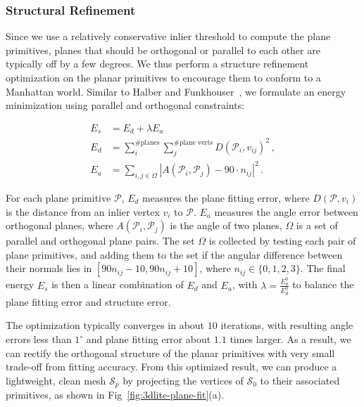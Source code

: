 \subsubsection{Structural Refinement}
\label{sec:fit-refine}

Since we use a relatively conservative inlier threshold to compute the plane primitives, planes that should be orthogonal or parallel to each other are typically off by a few degrees.
We thus perform a structure refinement optimization on the planar primitives to encourage them to conform to a Manhattan world.
Similar to Halber and Funkhouser~\cite{halber2016fine}, we formulate an energy minimization using parallel and orthogonal constraints:

\begin{align}
    E_s &= E_d + \lambda E_a\, \\
    E_d &= \sum_{i}^{\#\textrm{planes}} \sum_{j}^{\#\textrm{plane verts}} D(\mathcal{P}_i,v_{ij})^2\,,\\
    E_a &= \sum_{i,j\in \Omega} |A(\mathcal{P}_i,\mathcal{P}_j)-90\cdot n_{ij}|^2\,.
\end{align}

For each plane primitive $\mathcal{P}$, $E_d$ measures the plane fitting error, where $D(\mathcal{P},v_i)$ is the distance from an inlier vertex $v_i$ to $\mathcal{P}$. 
$E_a$ measures the angle error between orthogonal planes, where $A(\mathcal{P}_i,\mathcal{P}_j)$ is the angle of two planes, $\Omega$ is a set of parallel and orthogonal plane pairs. 
The set $\Omega$ is collected by testing each pair of plane primitives, and adding them to the set if the angular difference between their normals lies in $[90n_{ij}-10, 90n_{ij}+10]$, where $n_{ij}\in \{0,1,2,3\}$. 
The final energy $E_s$ is then a linear combination of $E_d$ and $E_a$, with $\lambda=\frac{E_a^0}{E_d^0}$ to balance the plane fitting error and structure error.

The optimization typically converges in about $10$ iterations, with resulting angle errors less than $1^{\circ}$ and plane fitting error about $1.1$ times larger. 
As a result, we can rectify the orthogonal structure of the planar primitives with very small trade-off from fitting accuracy.
From this optimized result, we can produce a lightweight, clean mesh $\mathcal{S}_p$ by projecting the vertices of $\mathcal{S}_0$ to their associated primitives, as shown in Fig~\ref{fig:3dlite-plane-fit}(a). 

